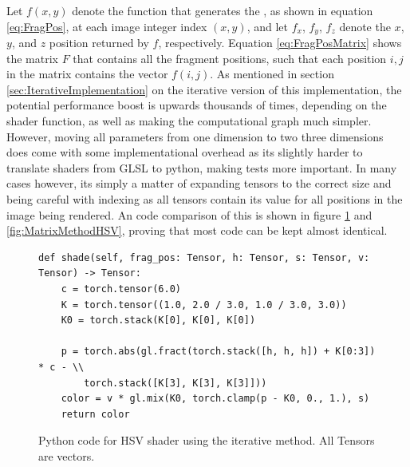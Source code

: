 Let $f(x,y)$ denote the function that generates the , as shown in equation \ref{eq:FragPos}, at each image integer index $(x,y)$, and let $f_x$, $f_y$, $f_z$ denote the $x$,$y$, and $z$ position returned by $f$, respectively. Equation \ref{eq:FragPosMatrix} shows the matrix $F$ that contains all the fragment positions, such that each position $i,j$ in the matrix contains the vector $f(i,j)$. As mentioned in section \ref{sec:IterativeImplementation} on the iterative version of this implementation, the potential performance boost is upwards thousands of times, depending on the shader function, as well as making the computational graph much simpler. However, moving all parameters from one dimension to two three dimensions does come with some implementational overhead as its slightly harder to translate shaders from GLSL to python, making tests more important. In many cases however, its simply a matter of expanding tensors to the correct size and being careful with indexing as all tensors contain its value for all positions in the image being rendered. An code comparison of this is shown in figure \ref{fig:IterativeMethodHSV} and \ref{fig:MatrixMethodHSV}, proving that most code can be kept almost identical. 

\begin{figure}[h]
    \begin{verbatim}
def shade(self, frag_pos: Tensor, h: Tensor, s: Tensor, v: Tensor) -> Tensor:
    c = torch.tensor(6.0)
    K = torch.tensor((1.0, 2.0 / 3.0, 1.0 / 3.0, 3.0))
    K0 = torch.stack(K[0], K[0], K[0])
    
    p = torch.abs(gl.fract(torch.stack([h, h, h]) + K[0:3]) * c - \\
        torch.stack([K[3], K[3], K[3]]))
    color = v * gl.mix(K0, torch.clamp(p - K0, 0., 1.), s)
    return color
    \end{verbatim}
    
\caption{Python code for HSV shader using the iterative method. All Tensors are vectors.}
\label{fig:IterativeMethodHSV}
\end{figure}

